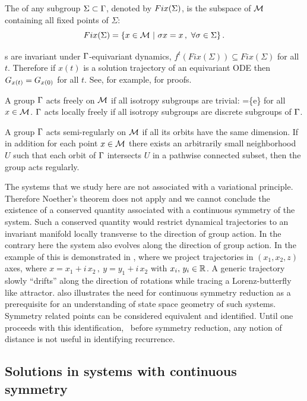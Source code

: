 The \emph{\fixedsp} of any subgroup $\Sigma\subset\Gamma$,
denoted by $Fix(\Sigma)$, is the subspace of $\mathcal{M}$ containing all fixed points of $\Sigma$:
\[
	Fix(\Sigma)=\{x\in\mathcal{M}\ |\ \sigma x = x\,,\ \forall \sigma\in\Sigma\}\,.
\]

\Fixedsp s are invariant under $\Gamma$-equivariant dynamics, $f^t\left(Fix(\Sigma)\right)\subseteq Fix(\Sigma)$
for all $t$. Therefore if $x(t)$ is a solution trajectory of an equivariant ODE then
$G_{x(t)}=G_{x(0)}$ for all $t$. See, for example, for proofs.

A group $\Gamma$ acts freely on $\mathcal{M}$ if all isotropy subgroups 
are trivial: =\{e\} for all $x\in \mathcal{M}$.
$\Gamma$ acts locally freely if all isotropy subgroups 
are discrete subgroups of $\Gamma$.

A group $\Gamma$ acts semi-regularly on $\mathcal{M}$ if all its orbits have the same dimension.
If in addition for each point $x\in \mathcal{M}$ there exists an arbitrarily 
small neighborhood $U$ such that each orbit of $\Gamma$ intersects $U$ 
in a pathwise connected subset, then the group acts regularly.

The systems that we study here are not associated with a
variational principle. Therefore Noether's theorem does not
apply and we  cannot conclude the existence of a conserved
quantity associated with a continuous symmetry of the system.
Such a conserved quantity would restrict dynamical
trajectories to an invariant manifold locally transverse to
the direction of group action. In the contrary here the
system also evolves along the direction of group action. In
the example of {\CLe} this is demonstrated in
, where we project trajectories in
$(x_1,x_2,z)$ axes, where $x=x_1+ i\, x_2\,,\ y=y_1+i\, x_2$
with $x_i,\,y_i\in\mathbb{R}^{}$. A generic trajectory slowly ``drifts'' 
along the direction of rotations while tracing a Lorenz-butterfly
like attractor.  also
illustrates the need for continuous symmetry reduction as a
prerequisite for an understanding of state space geometry of
such systems. Symmetry related points can be considered equivalent
and identified. Until one proceeds with this identification, \ie\ before
symmetry reduction, any notion of distance is not useful in identifying recurrence.

\subsection{Solutions in systems with continuous symmetry}

